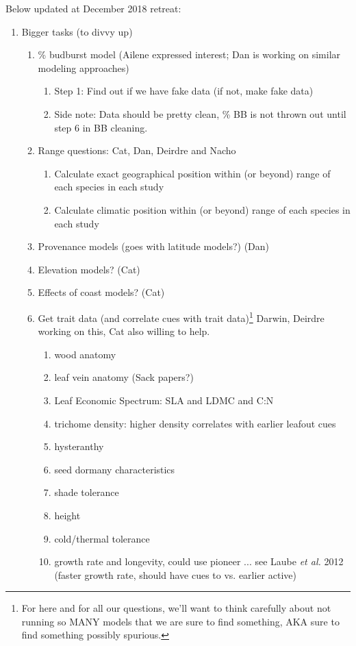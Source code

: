 \documentclass[11pt,letterpaper]{article}
\begin{document}
Below updated at December 2018 retreat:
\begin{enumerate}
\item Bigger tasks (to divvy up)
\begin{enumerate}
\item \% budburst model (Ailene expressed interest; Dan is working on similar modeling approaches)
\begin{enumerate}
\item Step 1: Find out if we have fake data (if not, make fake data)
\item Side note: Data should be pretty clean, \% BB is not thrown out until step 6 in BB cleaning.
\end{enumerate}
\item Range questions: Cat, Dan, Deirdre and Nacho
\begin{enumerate}
\item Calculate exact geographical position within (or beyond) range of each species in each study
\item Calculate climatic position within (or beyond) range of each species in each study 
\end{enumerate}
\item Provenance models (goes with latitude models?) (Dan)
\item Elevation models? (Cat)
\item Effects of coast models? (Cat)
\item Get trait data (and correlate cues with trait data)\footnote{For here and for all our questions, we'll want to think carefully about not running so MANY models that we are sure to find something, AKA sure to find something possibly spurious.} Darwin, Deirdre working on this, Cat also willing to help.
\begin{enumerate}
\item wood anatomy
\item leaf vein anatomy (Sack papers?)
\item Leaf Economic Spectrum: SLA and LDMC and C:N
\item trichome density: higher density correlates with earlier leafout cues
\item hysteranthy
\item seed dormany characteristics
\item shade tolerance
\item height
\item cold/thermal tolerance 
\item growth rate and longevity, could use pioneer ... see Laube \emph{et al.} 2012 (faster growth rate, should have cues to vs. earlier active)

\end{enumerate}
\end{enumerate}
\end{enumerate}
\end{document}
